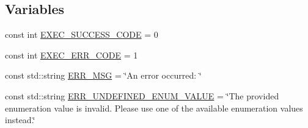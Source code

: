 \subsection*{Variables}
\begin{DoxyCompactItemize}
\item 
const int \hyperlink{namespacemultiscale_af1a144a9112490c157ff445b56e322b2}{E\-X\-E\-C\-\_\-\-S\-U\-C\-C\-E\-S\-S\-\_\-\-C\-O\-D\-E} = 0
\item 
const int \hyperlink{namespacemultiscale_aa7639e216821c93df25ffa95f5d140f0}{E\-X\-E\-C\-\_\-\-E\-R\-R\-\_\-\-C\-O\-D\-E} = 1
\item 
const std\-::string \hyperlink{namespacemultiscale_a06490e4e11ef359aa0260f96579ce584}{E\-R\-R\-\_\-\-M\-S\-G} = \char`\"{}An error occurred\-: \char`\"{}
\item 
const std\-::string \hyperlink{namespacemultiscale_a870e6a43e813a5df46b265f4986a0510}{E\-R\-R\-\_\-\-U\-N\-D\-E\-F\-I\-N\-E\-D\-\_\-\-E\-N\-U\-M\-\_\-\-V\-A\-L\-U\-E} = \char`\"{}The provided enumeration value is invalid. Please use one of the available enumeration values instead.\char`\"{}
\end{DoxyCompactItemize}


